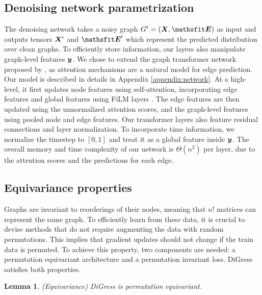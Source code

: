\documentclass{article} %
\theoremstyle{plain}
\newtheorem{lemma}[theorem]{Lemma}
\theoremstyle{definition}
\theoremstyle{remark}
\begin{document}
\subsection{Denoising network parametrization}
The denoising network takes a noisy graph $G^t = (\mX, \tE)$ as input and outputs tensors ${\bm{X}}'$ and $\tE'$ which represent the predicted  distribution over clean graphs. To efficiently store information, our layers also manipulate graph-level features ${\bm{y}}$. We chose to extend the graph transformer network proposed by \citet{dwivedi2020generalization}, as attention mechanisms are a natural model for edge prediction. 
Our model is described in details in Appendix \ref{appendix:network}. At a high-level, it first updates node features using self-attention, incorporating edge features and global features using FiLM layers \citep{perez2018film}. The edge features are then updated using the unnormalized attention scores, and the graph-level features using pooled node and edge features. Our transformer layers also feature residual connections and layer normalization.
To incorporate time information, we normalize the timestep to $[0, 1]$ and treat it as a global feature inside ${\bm{y}}$. The overall memory and time complexity of our network is $\Theta(n^2)$ per layer, due to the attention scores and the predictions for each edge.

\subsection{Equivariance properties}
Graphs are invariant to reorderings of their nodes, meaning that $n!$ matrices can represent the same graph. To efficiently learn from these data, it is crucial to devise methods that do not require augmenting the data with random permutations. This implies that gradient updates should not change if the train data is permuted. 
 To achieve this property, two components are needed: a permutation equivariant architecture and a permutation invariant loss. DiGress satisfies both properties.

\begin{lemma} (Equivariance) \label{lemma:equiv-model} 
DiGress is permutation equivariant.
\end{lemma}

\end{document}
